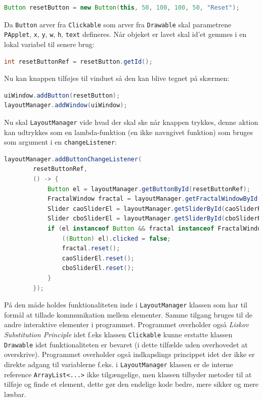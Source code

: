 \documentclass{article}
\begin{document}
\begin{lstlisting}[language=Java]
Button resetButton = new Button(this, 50, 100, 100, 50, "Reset");
\end{lstlisting}
Da \texttt{Button} arver fra \texttt{Clickable} som arver fra \texttt{Drawable} skal parametrene \texttt{PApplet}, \texttt{x}, \texttt{y}, \texttt{w}, \texttt{h}, \texttt{text} defineres. Når objeket er lavet skal id'et gemmes i en lokal variabel til senere brug:
\begin{lstlisting}[language=Java]
int resetButtonRef = resetButton.getId();
\end{lstlisting}
Nu kan knappen tilføjes til vinduet så den kan blive tegnet på skærmen:
\begin{lstlisting}[language=Java]
uiWindow.addButton(resetButton);
layoutManager.addWindow(uiWindow);
\end{lstlisting}
Nu skal \texttt{LayoutManager} vide hvad der skal ske når knappen trykkes, denne aktion kan udtrykkes som en lambda-funktion (en ikke navngivet funktion) som bruges som argument i en \texttt{changeListener}:
\begin{lstlisting}[language=Java]
layoutManager.addButtonChangeListener(
        resetButtonRef,
        () -> {
            Button el = layoutManager.getButtonById(resetButtonRef);
            FractalWindow fractal = layoutManager.getFractalWindowById(fractalWindowRef);
            Slider caoSliderEl = layoutManager.getSliderById(caoSliderRef);
            Slider cboSliderEl = layoutManager.getSliderById(cboSliderRef);
            if (el instanceof Button && fractal instanceof FractalWindow) {
                ((Button) el).clicked = false;
                fractal.reset();
                caoSliderEl.reset();
                cboSliderEl.reset();
            }
        });
\end{lstlisting}
På den måde holdes funktionaliteten inde i \texttt{LayoutManager} klassen som har til formål at tillade kommunikation mellem elementer. Samme tilgang bruges til de andre interaktive elementer i programmet. Programmet overholder også \textit{Liskov Substitution Principle} idet f.eks klassen \texttt{Clickable} kunne erstatte klassen \texttt{Drawable} idet funktionaliteten er bevaret (i dette tilfælde uden overhovedet at overskrive). Programmet overholder også indkapslings princippet idet der ikke er direkte adgang til variablerne f.eks. i \texttt{LayoutManager} klassen er de interne reference \texttt{ArrayList<...>} ikke tilgængelige, men klassen tilbyder metoder til at tilføje og finde et element, dette gør den endelige kode bedre, mere sikker og mere læsbar.
\end{document}

